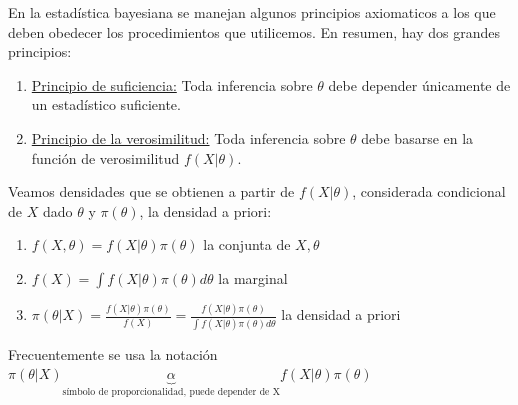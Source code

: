 \documentclass[10pt]{article}
\theoremstyle{plain}
\theoremstyle{definition}
\begin{document}
En la estadística bayesiana se manejan algunos principios axiomaticos a los que deben obedecer los procedimientos que utilicemos. En resumen, hay dos grandes principios:
\begin{enumerate}
\item \underline{Principio de suficiencia:} Toda inferencia sobre $\theta$ debe depender únicamente de un estadístico suficiente.
\item \underline{Principio de la verosimilitud:} Toda inferencia sobre $\theta$ debe basarse en la función de verosimilitud $f(X|\theta)$.
\end{enumerate}
Veamos densidades que se obtienen a partir de $f(X|\theta)$, considerada condicional de $X$ dado $\theta$ y $\pi(\theta)$, la densidad a priori:
\begin{enumerate}
\item $f(X,\theta) = f(X|\theta)\pi(\theta)$ la conjunta de $X,\theta$
\item $f(X) = \int f(X|\theta)\pi(\theta)d\theta$ la marginal
\item $\pi(\theta|X) = \frac{f(X|\theta)\pi(\theta)}{f(X)} = \frac{f(X|\theta)\pi(\theta)}{\int f(X|\theta)\pi(\theta)d\theta}$ la densidad a priori
\end{enumerate}
Frecuentemente se usa la notación $\pi(\theta|X) \underbrace{\alpha}_{\text{símbolo de proporcionalidad, puede depender de X}} f(X|\theta)\pi(\theta)$\\
\end{document}
